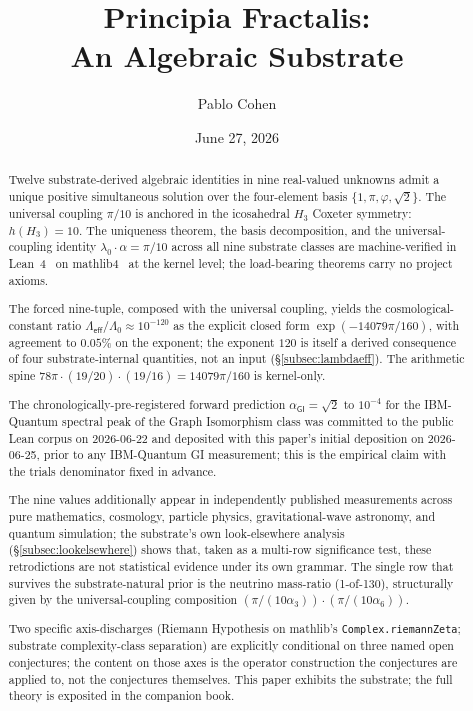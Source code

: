 \documentclass[11pt,a4paper]{amsart}
\title{Principia Fractalis:\\ An Algebraic Substrate}
\author{Pablo Cohen}
\date{June 27, 2026}
\theoremstyle{plain}
\theoremstyle{definition}
\begin{document}
\maketitle

\begin{abstract}
Twelve substrate-derived algebraic identities in nine real-valued unknowns admit a unique positive simultaneous solution over the four-element basis $\{1,\pi,\varphi,\sqrt{2}\}$. The universal coupling $\pi/10$ is anchored in the icosahedral $H_3$ Coxeter symmetry: $h(H_3) = 10$. The uniqueness theorem, the basis decomposition, and the universal-coupling identity $\lambda_0 \cdot \alpha = \pi/10$ across all nine substrate classes are machine-verified in Lean~4~\cite{moura-ullrich2021} on mathlib4~\cite{mathlib4} at the kernel level; the load-bearing theorems carry no project axioms.

The forced nine-tuple, composed with the universal coupling, yields the cosmological-constant ratio $\Lambda_{\textsf{eff}}/\Lambda_0 \approx 10^{-120}$ as the explicit closed form $\exp(-14079\pi/160)$, with agreement to $0.05\%$ on the exponent; the exponent $120$ is itself a derived consequence of four substrate-internal quantities, not an input (\S\ref{subsec:lambdaeff}). The arithmetic spine $78\pi \cdot (19/20) \cdot (19/16) = 14079\pi/160$ is kernel-only.

The chronologically-pre-registered forward prediction $\alpha_{\textsf{GI}} = \sqrt{2}$ to $10^{-4}$ for the IBM-Quantum spectral peak of the Graph Isomorphism class was committed to the public Lean corpus on 2026-06-22 and deposited with this paper's initial deposition on 2026-06-25, prior to any IBM-Quantum GI measurement; this is the empirical claim with the trials denominator fixed in advance.

The nine values additionally appear in independently published measurements across pure mathematics, cosmology, particle physics, gravitational-wave astronomy, and quantum simulation; the substrate's own look-elsewhere analysis (\S\ref{subsec:lookelsewhere}) shows that, taken as a multi-row significance test, these retrodictions are not statistical evidence under its own grammar. The single row that survives the substrate-natural prior is the neutrino mass-ratio (1-of-130), structurally given by the universal-coupling composition $(\pi/(10\alpha_3))\cdot(\pi/(10\alpha_6))$.

Two specific axis-discharges (Riemann Hypothesis on mathlib's \texttt{Complex.riemannZeta}; substrate complexity-class separation) are explicitly conditional on three named open conjectures; the content on those axes is the operator construction the conjectures are applied to, not the conjectures themselves. This paper exhibits the substrate; the full theory is exposited in the companion book.
\end{abstract}
\end{document}
